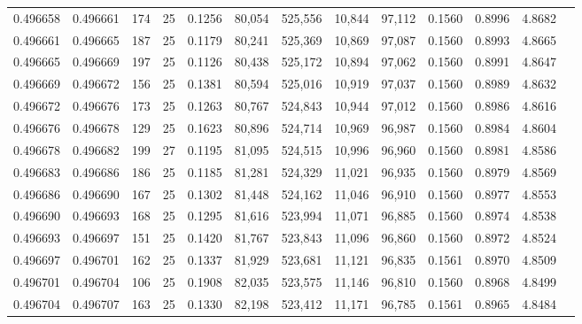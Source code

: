 \begin{tabular}{rrrrrrrrrrrrr}
0.496658 & 0.496661 & 174 &  25 &                                     0.1256 &  80,054 & 525,556 &  10,844 &  97,112 & 0.1560 & 0.8996 & 4.8682 \\
0.496661 & 0.496665 & 187 &  25 &                                     0.1179 &  80,241 & 525,369 &  10,869 &  97,087 & 0.1560 & 0.8993 & 4.8665 \\
0.496665 & 0.496669 & 197 &  25 &                                     0.1126 &  80,438 & 525,172 &  10,894 &  97,062 & 0.1560 & 0.8991 & 4.8647 \\
0.496669 & 0.496672 & 156 &  25 &                                     0.1381 &  80,594 & 525,016 &  10,919 &  97,037 & 0.1560 & 0.8989 & 4.8632 \\
0.496672 & 0.496676 & 173 &  25 &                                     0.1263 &  80,767 & 524,843 &  10,944 &  97,012 & 0.1560 & 0.8986 & 4.8616 \\
0.496676 & 0.496678 & 129 &  25 &                                     0.1623 &  80,896 & 524,714 &  10,969 &  96,987 & 0.1560 & 0.8984 & 4.8604 \\
0.496678 & 0.496682 & 199 &  27 &                                     0.1195 &  81,095 & 524,515 &  10,996 &  96,960 & 0.1560 & 0.8981 & 4.8586 \\
0.496683 & 0.496686 & 186 &  25 &                                     0.1185 &  81,281 & 524,329 &  11,021 &  96,935 & 0.1560 & 0.8979 & 4.8569 \\
0.496686 & 0.496690 & 167 &  25 &                                     0.1302 &  81,448 & 524,162 &  11,046 &  96,910 & 0.1560 & 0.8977 & 4.8553 \\
0.496690 & 0.496693 & 168 &  25 &                                     0.1295 &  81,616 & 523,994 &  11,071 &  96,885 & 0.1560 & 0.8974 & 4.8538 \\
0.496693 & 0.496697 & 151 &  25 &                                     0.1420 &  81,767 & 523,843 &  11,096 &  96,860 & 0.1560 & 0.8972 & 4.8524 \\
0.496697 & 0.496701 & 162 &  25 &                                     0.1337 &  81,929 & 523,681 &  11,121 &  96,835 & 0.1561 & 0.8970 & 4.8509 \\
0.496701 & 0.496704 & 106 &  25 &                                     0.1908 &  82,035 & 523,575 &  11,146 &  96,810 & 0.1560 & 0.8968 & 4.8499 \\
0.496704 & 0.496707 & 163 &  25 &                                     0.1330 &  82,198 & 523,412 &  11,171 &  96,785 & 0.1561 & 0.8965 & 4.8484 \\

\end{tabular}

